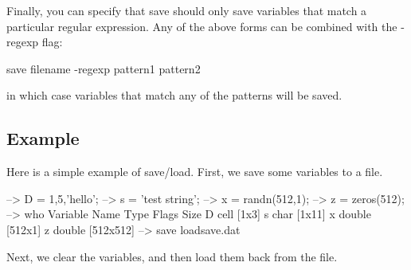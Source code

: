 Finally, you can specify that {\ttfamily save} should only save variables that match a particular regular expression. Any of the above forms can be combined with the {\ttfamily -\/regexp} flag\-: \begin{DoxyVerb}   save filename -regexp pattern1 pattern2
\end{DoxyVerb}
 in which case variables that match any of the patterns will be saved. \hypertarget{variables_struct_Example}{}\subsection{Example}\label{variables_struct_Example}
Here is a simple example of {\ttfamily save}/{\ttfamily load}. First, we save some variables to a file.


\begin{DoxyVerbInclude}
--> D = {1,5,'hello'};
--> s = 'test string';
--> x = randn(512,1);
--> z = zeros(512);
--> who
  Variable Name       Type   Flags             Size
              D      cell                    [1x3]
              s      char                    [1x11]
              x    double                    [512x1]
              z    double                    [512x512]
--> save loadsave.dat
\end{DoxyVerbInclude}


Next, we clear the variables, and then load them back from the file.


